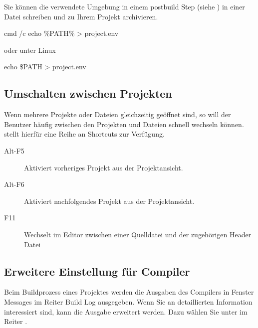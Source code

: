 

Sie können die verwendete Umgebung in einem postbuild Step (siehe ) in einer Datei  schreiben und zu Ihrem Projekt archivieren.

\begin{cmd}
cmd /c echo \%PATH\%  > project.env
\end{cmd}

oder unter Linux

\begin{cmd}
echo \$PATH > project.env
\end{cmd}

\subsection{Umschalten zwischen Projekten}

Wenn mehrere Projekte oder Dateien gleichzeitig geöffnet sind, so will der Benutzer häufig zwischen den Projekten und Dateien schnell wechseln können. \codeblocks stellt hierfür eine Reihe an Shortcuts zur Verfügung.

\begin{description}
\item[Alt-F5] Aktiviert vorheriges Projekt aus der Projektansicht.
\item[Alt-F6] Aktiviert nachfolgendes Projekt aus der Projektansicht.
\item[F11] Wechselt im Editor zwischen einer Quelldatei  und der zugehörigen Header Datei 
\end{description}

\subsection{Erweitere Einstellung für Compiler}

Beim Buildprozess eines Projektes werden die Ausgaben des Compilers in Fenster Messages im Reiter Build Log ausgegeben. Wenn Sie an detaillierten Information interessiert sind, kann die Ausgabe erweitert werden. Dazu wählen Sie unter  im Reiter .



